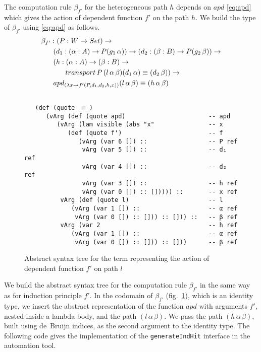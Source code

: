 \documentclass[sigplan,10pt]{acmart}
\begin{document}
The computation rule $\beta_{f'}$ for the heterogeneous path $h$ depends on $apd$ \eqref{eq:apd} which gives the action of dependent function $f'$ on the path $h$. We build the type of $\beta_{f'}$ using \eqref{eq:apd} as follows.
\begin{align}
&\beta_{f'} : (P : W \rightarrow Set) \rightarrow \nonumber \\
& \hspace {0.6cm} (d_1 : (\alpha : A) \rightarrow P (g_1 \, \alpha)) \rightarrow (d_2 : (\beta : B) \rightarrow P (g_2 \, \beta)) \rightarrow \nonumber \\
& \hspace {0.6cm} (h : (\alpha : A) \rightarrow (\beta : B) \rightarrow \nonumber \\
& \hspace {1.2cm} transport \, P \, (l \, \alpha \, \beta) (d_1 \, \alpha) \equiv (d_2 \, \beta)) \rightarrow \nonumber \\
& \hspace {0.6cm} apd_{(\lambda x \rightarrow f'(P, d_1, d_2, h, x))}(l \, \alpha \, \beta) \equiv (h \, \alpha \, \beta) \nonumber
\end{align}

\begin{figure}
\begin{center}
\begingroup
\fontsize{7pt}{9pt}\selectfont
\begin{Verbatim}[frame = single]

   (def (quote _≡_)
      (vArg (def (quote apd)                       -- apd
         (vArg (lam visible (abs "x"               -- x
            (def (quote f')                        -- f
               (vArg (var 6 []) ::                 -- P ref
                vArg (var 5 []) ::                 -- d₁ ref
                vArg (var 4 []) ::                 -- d₂ ref
                vArg (var 3 []) ::                 -- h ref
                vArg (var 0 []) :: [])))) ::       -- x ref
          vArg (def (quote l)                      -- l
             (vArg (var 1 []) ::                   -- α ref
              vArg (var 0 []) :: [])) :: [])) ::   -- β ref
          vArg (var 2                              -- h ref
             (vArg (var 1 []) ::                   -- α ref
              vArg (var 0 []) :: [])) :: []))      -- β ref

\end{Verbatim}
\endgroup
\end{center}
\caption{Abstract syntax tree for the term representing the action of dependent function $f'$ on path $l$}
\label{fig:ast-beta-f'}
\end{figure}

We build the abstract syntax tree for the computation rule $\beta_{f'}$ in the same way as for induction principle $f'$. In the codomain of $\beta_{f'}$ (fig.~\ref{fig:ast-beta-f'}), which is an identity type, we insert the abstract representation of the function $apd$ with arguments $f'$, nested inside a lambda body, and the path $(l \, \alpha \, \beta)$. We pass the path $(h \, \alpha \, \beta)$, built using de~Bruijn indices, as the second argument to the identity type. The following code gives the implementation of the {\tt generateIndHit} interface in the automation tool.
\end{document}
